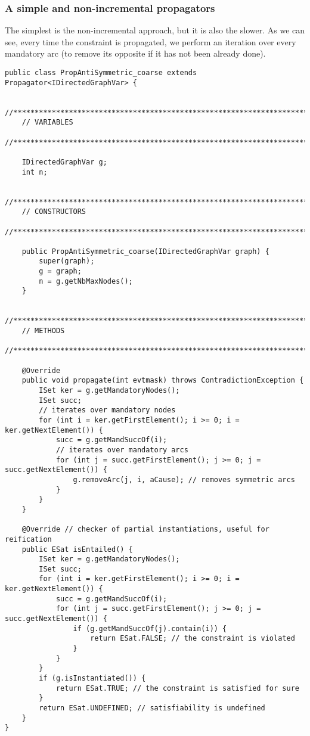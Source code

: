 \documentclass{article}
\begin{document}
\subsubsection{A simple and non-incremental propagators}

The simplest is the non-incremental approach, but it is also the slower. As we can see, every time the constraint is propagated, we perform an iteration over every mandatory arc (to remove its opposite if it has not been already done). 

\begin{lstlisting}
public class PropAntiSymmetric_coarse extends Propagator<IDirectedGraphVar> {

    //***********************************************************************************
    // VARIABLES
    //***********************************************************************************

	IDirectedGraphVar g;
    int n;

    //***********************************************************************************
    // CONSTRUCTORS
    //***********************************************************************************

    public PropAntiSymmetric_coarse(IDirectedGraphVar graph) {
        super(graph);
        g = graph;
        n = g.getNbMaxNodes();
    }

    //***********************************************************************************
    // METHODS
    //***********************************************************************************

    @Override
    public void propagate(int evtmask) throws ContradictionException {
        ISet ker = g.getMandatoryNodes();
        ISet succ;
        // iterates over mandatory nodes
        for (int i = ker.getFirstElement(); i >= 0; i = ker.getNextElement()) {
            succ = g.getMandSuccOf(i);
            // iterates over mandatory arcs
            for (int j = succ.getFirstElement(); j >= 0; j = succ.getNextElement()) {
                g.removeArc(j, i, aCause); // removes symmetric arcs
            }
        }
    }

    @Override // checker of partial instantiations, useful for reification
    public ESat isEntailed() {
        ISet ker = g.getMandatoryNodes();
        ISet succ;
        for (int i = ker.getFirstElement(); i >= 0; i = ker.getNextElement()) {
            succ = g.getMandSuccOf(i);
            for (int j = succ.getFirstElement(); j >= 0; j = succ.getNextElement()) {
                if (g.getMandSuccOf(j).contain(i)) {
                    return ESat.FALSE; // the constraint is violated
                }
            }
        }
        if (g.isInstantiated()) {
            return ESat.TRUE; // the constraint is satisfied for sure
        }
        return ESat.UNDEFINED; // satisfiability is undefined 
    }
}
\end{lstlisting}
\end{document}
